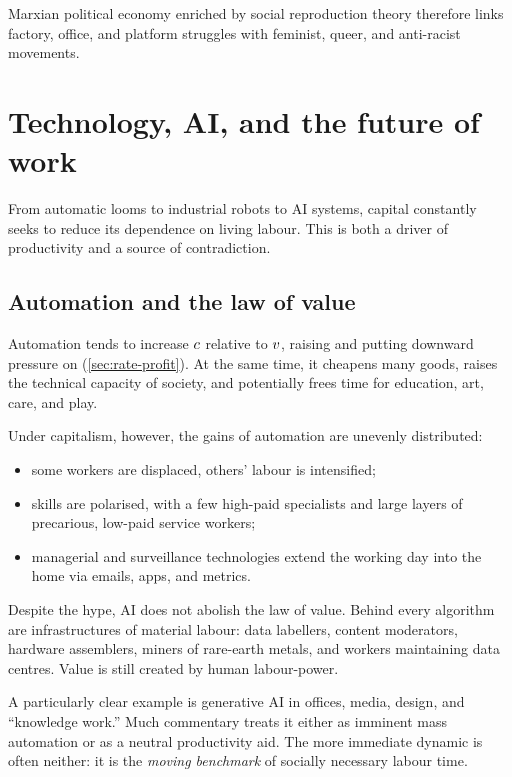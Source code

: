 Marxian political economy enriched by social reproduction theory therefore
links factory, office, and platform struggles with feminist, queer, and
anti-racist movements.\cite{BhattacharyaSRT}

\section{Technology, AI, and the future of work}
\label{sec:technology-ai}

From automatic looms to industrial robots to AI systems, capital constantly
seeks to reduce its dependence on living labour. This is both a driver of
productivity and a source of contradiction.

\subsection{Automation and the law of value}

Automation tends to increase $c$ relative to $v$, raising \OCC{}
and putting downward pressure on \profitrate{} (\cref{sec:rate-profit}). At
the same time, it cheapens many goods, raises the technical capacity of
society, and potentially frees time for education, art, care, and play.

Under capitalism, however, the gains of automation are unevenly distributed:

\begin{itemize}[leftmargin=1.5em]
  \item some workers are displaced, others' labour is intensified;
  \item skills are polarised, with a few high-paid specialists and large layers of
  precarious, low-paid service workers;
  \item managerial and surveillance technologies extend the working day into
  the home via emails, apps, and metrics.
\end{itemize}

Despite the hype, AI does not abolish the law of value. Behind every
algorithm are infrastructures of material labour: data labellers, content
moderators, hardware assemblers, miners of rare-earth metals, and workers
maintaining data centres. Value is still created by human labour-power.

A particularly clear example is generative AI in offices, media, design, and “knowledge work.”
Much commentary treats it either as imminent mass automation or as a neutral productivity aid.
The more immediate dynamic is often neither: it is the \emph{moving benchmark} of socially necessary labour time.

